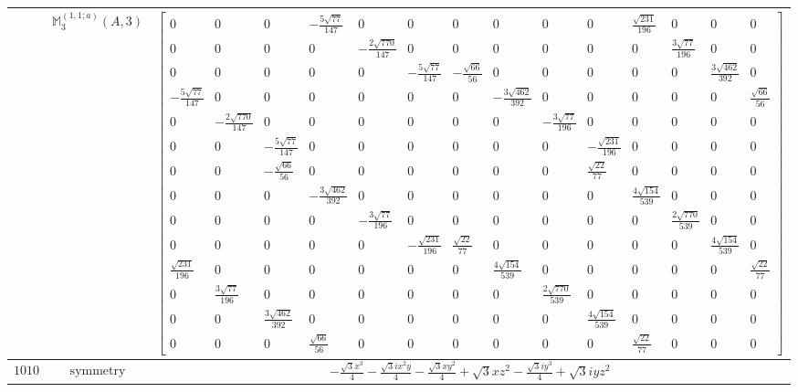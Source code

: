 \documentclass[fleqn,8pt,landscape]{jsarticle}
\begin{document}
\begin{longtable}{ccc}
$  $ & $ \mathbb{M}_{3}^{(1,1;a)}(A,3) $ & $ \begin{bmatrix} 0 & 0 & 0 & - \frac{5 \sqrt{77}}{147} & 0 & 0 & 0 & 0 & 0 & 0 & \frac{\sqrt{231}}{196} & 0 & 0 & 0 \\ 0 & 0 & 0 & 0 & - \frac{2 \sqrt{770}}{147} & 0 & 0 & 0 & 0 & 0 & 0 & \frac{3 \sqrt{77}}{196} & 0 & 0 \\ 0 & 0 & 0 & 0 & 0 & - \frac{5 \sqrt{77}}{147} & - \frac{\sqrt{66}}{56} & 0 & 0 & 0 & 0 & 0 & \frac{3 \sqrt{462}}{392} & 0 \\ - \frac{5 \sqrt{77}}{147} & 0 & 0 & 0 & 0 & 0 & 0 & - \frac{3 \sqrt{462}}{392} & 0 & 0 & 0 & 0 & 0 & \frac{\sqrt{66}}{56} \\ 0 & - \frac{2 \sqrt{770}}{147} & 0 & 0 & 0 & 0 & 0 & 0 & - \frac{3 \sqrt{77}}{196} & 0 & 0 & 0 & 0 & 0 \\ 0 & 0 & - \frac{5 \sqrt{77}}{147} & 0 & 0 & 0 & 0 & 0 & 0 & - \frac{\sqrt{231}}{196} & 0 & 0 & 0 & 0 \\ 0 & 0 & - \frac{\sqrt{66}}{56} & 0 & 0 & 0 & 0 & 0 & 0 & \frac{\sqrt{22}}{77} & 0 & 0 & 0 & 0 \\ 0 & 0 & 0 & - \frac{3 \sqrt{462}}{392} & 0 & 0 & 0 & 0 & 0 & 0 & \frac{4 \sqrt{154}}{539} & 0 & 0 & 0 \\ 0 & 0 & 0 & 0 & - \frac{3 \sqrt{77}}{196} & 0 & 0 & 0 & 0 & 0 & 0 & \frac{2 \sqrt{770}}{539} & 0 & 0 \\ 0 & 0 & 0 & 0 & 0 & - \frac{\sqrt{231}}{196} & \frac{\sqrt{22}}{77} & 0 & 0 & 0 & 0 & 0 & \frac{4 \sqrt{154}}{539} & 0 \\ \frac{\sqrt{231}}{196} & 0 & 0 & 0 & 0 & 0 & 0 & \frac{4 \sqrt{154}}{539} & 0 & 0 & 0 & 0 & 0 & \frac{\sqrt{22}}{77} \\ 0 & \frac{3 \sqrt{77}}{196} & 0 & 0 & 0 & 0 & 0 & 0 & \frac{2 \sqrt{770}}{539} & 0 & 0 & 0 & 0 & 0 \\ 0 & 0 & \frac{3 \sqrt{462}}{392} & 0 & 0 & 0 & 0 & 0 & 0 & \frac{4 \sqrt{154}}{539} & 0 & 0 & 0 & 0 \\ 0 & 0 & 0 & \frac{\sqrt{66}}{56} & 0 & 0 & 0 & 0 & 0 & 0 & \frac{\sqrt{22}}{77} & 0 & 0 & 0 \end{bmatrix} $ \\ \hline
$ 1010 $ & $ \text{symmetry} $ & $ - \frac{\sqrt{3} x^{3}}{4} - \frac{\sqrt{3} i x^{2} y}{4} - \frac{\sqrt{3} x y^{2}}{4} + \sqrt{3} x z^{2} - \frac{\sqrt{3} i y^{3}}{4} + \sqrt{3} i y z^{2} $ \\

\end{longtable}
\end{document}
